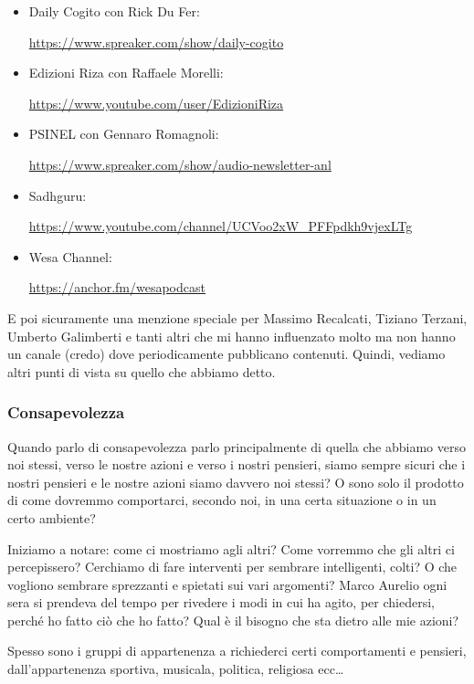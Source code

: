 \documentclass[12pt]{book} %
\begin{document}
\begin{itemize}
\item Daily Cogito con Rick Du Fer: \raggedright\url{https://www.spreaker.com/show/daily-cogito} 
\item Edizioni Riza con Raffaele Morelli: \raggedright\url{https://www.youtube.com/user/EdizioniRiza}
\item PSINEL con Gennaro Romagnoli: \raggedright\url{https://www.spreaker.com/show/audio-newsletter-anl} 
\item Sadhguru: \raggedright\url{https://www.youtube.com/channel/UCVoo2xW\_PFFpdkh9vjexLTg} 
\item Wesa Channel: \raggedright\url{https://anchor.fm/wesapodcast} 
\end{itemize}
E poi sicuramente una menzione speciale per Massimo Recalcati, Tiziano Terzani, Umberto Galimberti e tanti altri che mi
hanno influenzato molto ma non hanno un canale (credo) dove periodicamente pubblicano contenuti. Quindi, vediamo altri
punti di vista su quello che abbiamo detto.

\subsubsection{Consapevolezza}
Quando parlo di consapevolezza parlo principalmente di quella che abbiamo verso noi stessi, verso le nostre azioni e
verso i nostri pensieri, siamo sempre sicuri che i nostri pensieri e le nostre azioni siamo davvero noi stessi? O sono
solo il prodotto di come dovremmo comportarci, secondo noi, in una certa situazione o in un certo ambiente? 

Iniziamo a notare: come ci mostriamo agli altri? Come vorremmo che gli altri ci percepissero? Cerchiamo di fare
interventi per sembrare intelligenti, colti? O che vogliono sembrare sprezzanti e spietati sui vari argomenti? Marco
Aurelio ogni sera si prendeva del tempo per rivedere i modi in cui ha agito, per chiedersi, perché ho fatto ciò che ho
fatto? Qual è il bisogno che sta dietro alle mie azioni? 

Spesso sono i gruppi di appartenenza a richiederci certi comportamenti e pensieri,
dall'appartenenza sportiva, musicala, politica, religiosa ecc…
\end{document}

